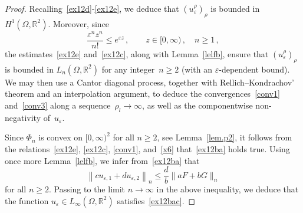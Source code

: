 \documentclass[10pt]{amsart}
\theoremstyle{definition}\newtheorem{defi}[theo]{Definition}\newtheorem{rema}[theo]{Remark}\newtheorem{exam}[theo]{Example}\newtheorem{exem}[theo]{Example}\newtheorem{nota}[theo]{Notation}
\newcommand{\bbR}{\mathbb{R}}
\begin{document}
\begin{proof}
Recalling~\eqref{ex12d}-\eqref{ex12e}, we deduce that $(u_\varepsilon^\rho)_\rho$ is bounded in $H^1(\Omega,\bbR^2)$. Moreover, since
\begin{equation}\label{x6}
\frac{\varepsilon^n z^n}{n!} \le e^{\varepsilon z}\,, \qquad z\in [0,\infty)\,, \quad n\ge 1\,, 
\end{equation}
the estimates~\eqref{ex12e} and~\eqref{ex12c}, along with Lemma~\ref{lelfb}, ensure that $(u_\varepsilon^\rho)_\rho$ is bounded in $L_n(\Omega,\bbR^2)$ for any integer~$n\geq 2$ (with an $\varepsilon$-dependent bound). We may then use a Cantor diagonal process, together with Rellich--Kondrachov' theorem and an interpolation argument, to deduce the convergences~\eqref{conv1} and~\eqref{conv3} along a sequence~$\rho_l\to\infty$, as well as the componentwise non-negativity of~$u_\varepsilon$.

Since $\Phi_n$ is convex on $[0,\infty)^2$ for all $n\geq 2$, see Lemma~\ref{lem.p2}, it follows from the relations~\eqref{ex12e}, \eqref{ex12c}, \eqref{conv1}, and~\eqref{x6} that~\eqref{ex12ba} holds true. Using once more Lemma~\ref{lelfb}, we infer from~\eqref{ex12ba} that
\begin{equation*}
\left\|c u_{\varepsilon,1} + d u_{\varepsilon, 2}\right\|_n \le \frac{d}{b} \|a F + b G\|_n
\end{equation*}
for all $n\ge 2$. Passing to the limit $n\to\infty$ in the above inequality, we deduce that the function $u_\varepsilon\in L_\infty(\Omega,\bbR^2)$ satisfies~\eqref{ex12bac}.


\end{proof}
\end{document}
